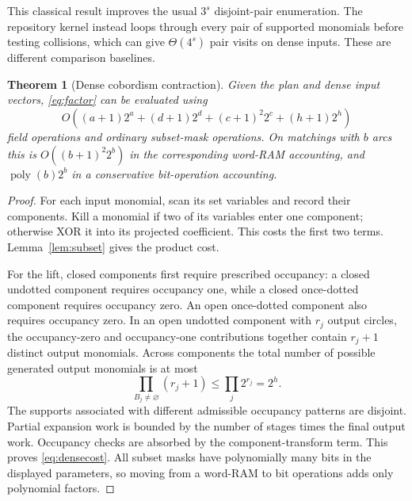 \documentclass[11pt]{article}
\newtheorem{theorem}{Theorem}[section]
\theoremstyle{definition}\newtheorem{definition}[theorem]{Definition}
\theoremstyle{remark}\newtheorem{remark}[theorem]{Remark}
\newcommand{\poly}{\operatorname{poly}}
\begin{document}
This classical result improves the usual $3^s$ disjoint-pair enumeration. The repository kernel instead loops through every pair of supported monomials before testing collisions, which can give $\Theta(4^s)$ pair visits on dense inputs. These are different comparison baselines.

\begin{theorem}[Dense cobordism contraction]\label{thm:complexity}
Given the plan and dense input vectors, \eqref{eq:factor} can be evaluated using
\begin{equation}\label{eq:densecost}
 O\!\left((a+1)2^a+(d+1)2^d+(c+1)^2 2^c+(h+1)2^h\right)
\end{equation}
field operations and ordinary subset-mask operations. On matchings with $b$ arcs this is $O((b+1)^2 2^b)$ in the corresponding word-RAM accounting, and $\poly(b)2^b$ in a conservative bit-operation accounting.
\end{theorem}
\begin{proof}
For each input monomial, scan its set variables and record their components. Kill a monomial if two of its variables enter one component; otherwise XOR it into its projected coefficient. This costs the first two terms. Lemma~\ref{lem:subset} gives the product cost.

For the lift, closed components first require prescribed occupancy: a closed undotted component requires occupancy one, while a closed once-dotted component requires occupancy zero. An open once-dotted component also requires occupancy zero. In an open undotted component with $r_j$ output circles, the occupancy-zero and occupancy-one contributions together contain $r_j+1$ distinct output monomials. Across components the total number of possible generated output monomials is at most
\[
 \prod_{B_j\ne\varnothing}(r_j+1)\leq\prod_j2^{r_j}=2^h.
\]
The supports associated with different admissible occupancy patterns are disjoint. Partial expansion work is bounded by the number of stages times the final output work. Occupancy checks are absorbed by the component-transform term. This proves \eqref{eq:densecost}. All subset masks have polynomially many bits in the displayed parameters, so moving from a word-RAM to bit operations adds only polynomial factors.
\end{proof}
\end{document}
